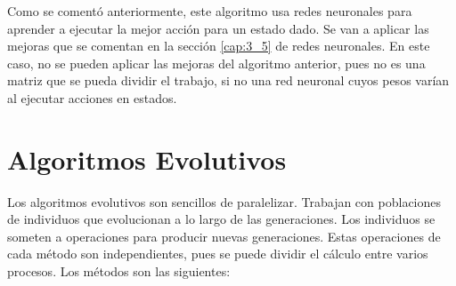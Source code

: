			
		
		Como se comentó anteriormente, este algoritmo usa redes neuronales para aprender a ejecutar la mejor acción para un estado dado. Se van a aplicar las mejoras que se comentan en la sección \ref{cap:3_5} de redes neuronales. En este caso, no se pueden aplicar las mejoras del algoritmo anterior, pues no es una matriz que se pueda dividir el trabajo, si no una red neuronal cuyos pesos varían al ejecutar acciones en estados. 	
		
		
	
		
	
	


\section{Algoritmos Evolutivos}
	\label{cap:3_4}
	Los algoritmos evolutivos son sencillos de paralelizar. Trabajan con poblaciones de individuos que evolucionan a lo largo de las generaciones. Los individuos se someten a operaciones para producir nuevas generaciones. Estas operaciones de cada método son independientes, pues se puede dividir el cálculo entre varios procesos. Los métodos son las siguientes: 
	
